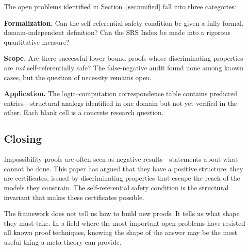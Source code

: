 \documentclass[11pt,a4paper]{article}
\theoremstyle{plain}
\theoremstyle{definition}
\theoremstyle{remark}
\begin{document}
The open problems identified in Section~\ref{sec:unified} fall into three categories:

\textbf{Formalization.} Can the self-referential safety condition be given a fully formal, domain-independent definition? Can the SRS Index be made into a rigorous quantitative measure?

\textbf{Scope.} Are there successful lower-bound proofs whose discriminating properties are \emph{not} self-referentially safe? The false-negative audit found none among known cases, but the question of necessity remains open.

\textbf{Application.} The logic--computation correspondence table contains predicted entries---structural analogs identified in one domain but not yet verified in the other. Each blank cell is a concrete research question.

\subsection{Closing}

Impossibility proofs are often seen as negative results---statements about what cannot be done. This paper has argued that they have a positive structure: they are certificates, issued by discriminating properties that escape the reach of the models they constrain. The self-referential safety condition is the structural invariant that makes these certificates possible.

The framework does not tell us how to build new proofs. It tells us what shape they must take. In a field where the most important open problems have resisted all known proof techniques, knowing the shape of the answer may be the most useful thing a meta-theory can provide.

\end{document}

